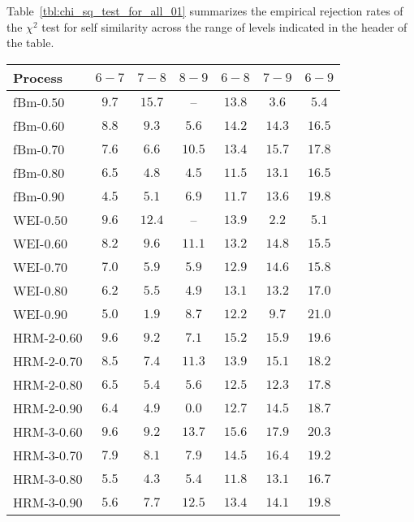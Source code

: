 Table~\ref{tbl:chi_sq_test_for_all_01} summarizes the empirical rejection rates of
the $\chi^2$ test for self similarity across the range of levels indicated in the
header of the table.
\begin{table}[h]\begin{center}
	\begin{tabular}{l||c|c|c|c|c|c|}
	Process 		& $6-7$ &  $7-8$ &  $8-9$ &  $6-8$ &  $7-9$ &  $6-9$ \\ \hline\hline
	  fBm-$0.50$	& $9.7$ & $15.7$ &     -- & $13.8$ &  $\mathbf{3.6}$ &  $5.4$ \\ \hline
	  fBm-$0.60$	& $8.8$ &  $9.3$ &  $\mathbf{5.6}$ & $14.2$ & $14.3$ & $16.5$ \\ \hline
	  fBm-$0.70$	& $7.6$ &  $\mathbf{6.6}$ & $10.5$ & $13.4$ & $15.7$ & $17.8$ \\ \hline
	  fBm-$0.80$	& $6.5$ &  $4.8$ &  $\mathbf{4.5}$ & $11.5$ & $13.1$ & $16.5$ \\ \hline
	  fBm-$0.90$	& $\mathbf{4.5}$ &  $5.1$ &  $6.9$ & $11.7$ & $13.6$ & $19.8$ \\ \hline\hline

	  WEI-$0.50$	& $9.6$ & $12.4$ &     -- & $13.9$ &  $\mathbf{2.2}$ &  $5.1$ \\ \hline
	  WEI-$0.60$	& $\mathbf{8.2}$ &  $9.6$ & $11.1$ & $13.2$ & $14.8$ & $15.5$ \\ \hline
	  WEI-$0.70$	& $7.0$ &  $\mathbf{5.9}$ &  $\mathbf{5.9}$ & $12.9$ & $14.6$ & $15.8$ \\ \hline
	  WEI-$0.80$	& $6.2$ &  $5.5$ &  $\mathbf{4.9}$ & $13.1$ & $13.2$ & $17.0$ \\ \hline
	  WEI-$0.90$	& $5.0$ &  $\mathbf{1.9}$ &  $8.7$ & $12.2$ &  $9.7$ & $21.0$ \\ \hline\hline

	HRM-2-$0.60$ 	& $9.6$ &  $9.2$ &  $\mathbf{7.1}$ & $15.2$ & $15.9$ & $19.6$ \\ \hline
	HRM-2-$0.70$ 	& $8.5$ &  $\mathbf{7.4}$ & $11.3$ & $13.9$ & $15.1$ & $18.2$ \\ \hline
	HRM-2-$0.80$ 	& $6.5$ &  $\mathbf{5.4}$ &  $5.6$ & $12.5$ & $12.3$ & $17.8$ \\ \hline
	HRM-2-$0.90$ 	& $6.4$ &  $\mathbf{4.9}$ &  $0.0$ & $12.7$ & $14.5$ & $18.7$ \\ \hline\hline

	HRM-3-$0.60$ 	& $9.6$ &  $\mathbf{9.2}$ & $13.7$ & $15.6$ & $17.9$ & $20.3$ \\ \hline
	HRM-3-$0.70$ 	& $\mathbf{7.9}$ &  $8.1$ &  $\mathbf{7.9}$ & $14.5$ & $16.4$ & $19.2$ \\ \hline
	HRM-3-$0.80$ 	& $5.5$ &  $\mathbf{4.3}$ &  $5.4$ & $11.8$ & $13.1$ & $16.7$ \\ \hline
	HRM-3-$0.90$ 	& $\mathbf{5.6}$ &  $7.7$ & $12.5$ & $13.4$ & $14.1$ & $19.8$ \\ \hline\hline


\end{tabular}
\end{center}
\end{table}
